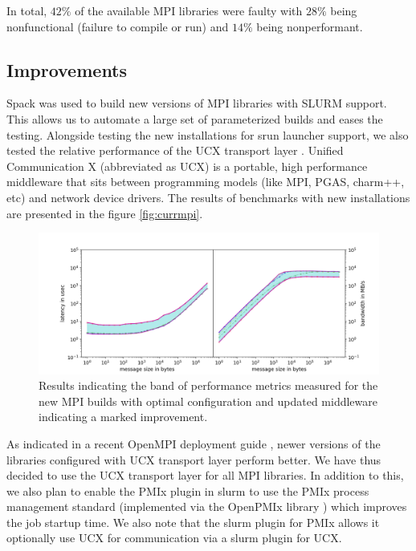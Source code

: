 \documentclass[sigconf,authordraft]{acmart}
\begin{document}
In total, $42\%$ of the available MPI libraries were faulty with $28\%$ being nonfunctional (failure to compile or run) and $14\%$ being nonperformant.

\subsection{Improvements}
 
Spack\cite{spack} was used to build new versions of MPI libraries with SLURM support. This allows us to automate a large set of parameterized builds and eases the testing. Alongside testing the new installations for srun launcher support, we also tested the relative performance of the UCX transport layer \cite{shamis2015ucx,openucx-website}. Unified Communication X (abbreviated as UCX) is a portable, high performance middleware that sits between programming models (like MPI, PGAS, charm++, etc) and network device drivers. The results of benchmarks with new installations are presented in the figure \ref{fig:currmpi}. 

\begin{figure}[h]
	\centering
	\includegraphics[width=\linewidth]{new_pearc}
	\caption{Results indicating the band of performance metrics measured for the 
	new MPI builds with optimal configuration and updated middleware indicating a marked improvement.}
	\label{fig:newmpi}
\end{figure}

As indicated in a recent OpenMPI deployment guide \cite{openmpi_deployment_tuning}, newer versions of the libraries configured with UCX transport layer perform better. We have thus  decided to use the UCX transport layer for all MPI libraries. In addition to this, we also plan to enable the PMIx plugin \cite{slurm_pmix_sc17,slurm_pmix_2019} in slurm to use the PMIx process management standard \cite{pmix,pmix_website} (implemented via the OpenPMIx library \cite{openpmix_website}) which improves the job startup time. We also note that the slurm plugin for PMIx allows it optionally use UCX for communication via a slurm plugin for UCX.
\end{document}
